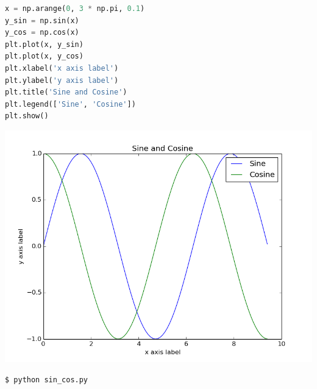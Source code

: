 \documentclass[8pt,a4paper,compress]{beamer}
\begin{document}
\begin{frame}[fragile]
\begin{minipage}{150pt}
\begin{lstlisting}[language=Python]
x = np.arange(0, 3 * np.pi, 0.1)
y_sin = np.sin(x)
y_cos = np.cos(x)
plt.plot(x, y_sin)
plt.plot(x, y_cos)
plt.xlabel('x axis label')
plt.ylabel('y axis label')
plt.title('Sine and Cosine')
plt.legend(['Sine', 'Cosine'])
plt.show()
\end{lstlisting}
\end{minipage}%
\begin{minipage}{150pt}
\begin{center}
\includegraphics[scale=0.2]{figures/sin_cos.png}

\smallskip

\lstinline{$ python sin_cos.py}
\end{center}
\end{minipage}
\end{frame}
\end{document}
